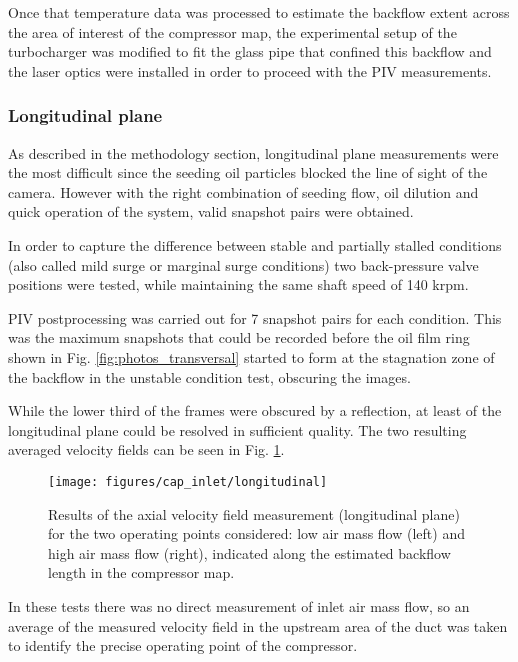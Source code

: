 Once that temperature data was processed to estimate the backflow extent across the area of interest of the compressor map, the experimental setup of the turbocharger was modified to fit the glass pipe that confined this backflow and the laser optics were installed in order to proceed with the PIV measurements.

\subsubsection{Longitudinal plane}

As described in the methodology section, longitudinal plane measurements were the most difficult since the seeding oil particles blocked the line of sight of the camera. However with the right combination of seeding flow, oil dilution and quick operation of the system, valid snapshot pairs were obtained.

In order to capture the difference between stable and partially stalled conditions (also called mild surge or marginal surge conditions) two back-pressure valve positions were tested, while maintaining the same shaft speed of 140 krpm.

PIV postprocessing was carried out for 7 snapshot pairs for each condition. This was the maximum snapshots that could be recorded before the oil film ring shown in Fig. \ref{fig:photos_transversal} started to form at the stagnation zone of the backflow in the unstable condition test, obscuring the images.

While the lower third of the frames were obscured by a reflection, at least  of the longitudinal plane could be resolved in sufficient quality. The two resulting averaged velocity fields can be seen in Fig. \ref{fig:longitudinal}.

\begin{figure}[t!]
\hspace{-0.1\textwidth}
\texttt{[image: figures/cap\_inlet/longitudinal]}
\caption{Results of the axial velocity field measurement (longitudinal plane) for the two operating points considered: low air mass flow (left) and high air mass flow (right), indicated along the estimated backflow length in the compressor map.}
\label{fig:longitudinal}
\end{figure}

In these tests there was no direct measurement of inlet air mass flow, so an average of the measured velocity field in the upstream area of the duct was taken to identify the precise operating point of the compressor.

